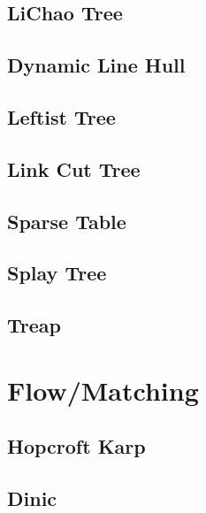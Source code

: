 \subsection{LiChao Tree}

\subsection{Dynamic Line Hull}

\subsection{Leftist Tree}

\subsection{Link Cut Tree}

%
%
\subsection{Sparse Table}

\subsection{Splay Tree}

\subsection{Treap}


\section{Flow/Matching}
\subsection{Hopcroft Karp}

\subsection{Dinic}

